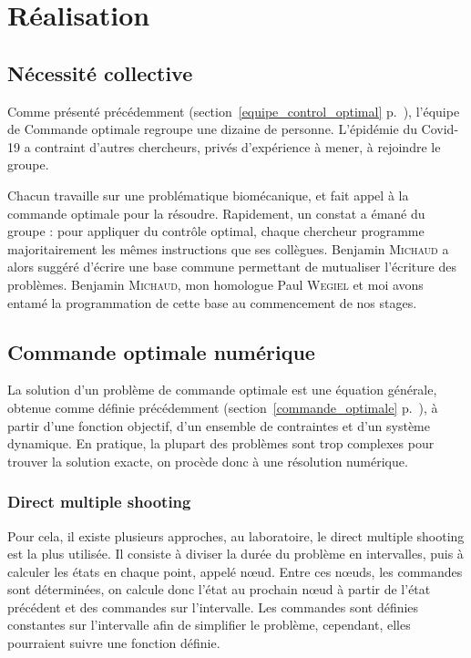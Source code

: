         
    \chapter{Réalisation}

        \section{Nécessité collective}
        
Comme présenté précédemment (section~\ref{equipe_control_optimal} p.~\pageref{equipe_control_optimal}), l'équipe de Commande optimale regroupe une dizaine de personne. L'épidémie du Covid-19 a contraint d'autres chercheurs, privés d'expérience à mener, à rejoindre le groupe.

Chacun travaille sur une problématique biomécanique, et fait appel à la commande optimale pour la résoudre. Rapidement,  un constat a émané du groupe : pour appliquer du contrôle optimal, chaque chercheur programme majoritairement les mêmes instructions que ses collègues.
Benjamin \textsc{Michaud} a alors suggéré d'écrire une base commune permettant de mutualiser l'écriture des problèmes. Benjamin \textsc{Michaud}, mon homologue Paul \textsc{Wegiel} et moi avons entamé la programmation de cette base au commencement de nos stages.
        
        
        \section{Commande optimale numérique}
        
        
    
La solution d’un problème de commande optimale est une équation générale, obtenue comme définie précédemment (section~\ref{commande_optimale} p.~\pageref{commande_optimale}), à partir d'une fonction objectif, d'un ensemble de contraintes et d'un système dynamique. En pratique, la plupart des problèmes sont trop complexes pour trouver la solution exacte, on procède donc à une résolution numérique.

            \subsection{Direct multiple shooting}

Pour cela, il existe plusieurs approches, au laboratoire, le direct multiple shooting est la plus utilisée. Il consiste à diviser la durée du problème en intervalles, puis à calculer les états en chaque point, appelé nœud. Entre ces nœuds, les commandes sont déterminées, on calcule donc l’état au prochain nœud à partir de l’état précédent et des commandes sur l’intervalle.
Les commandes sont définies constantes sur l’intervalle afin de simplifier le problème, cependant, elles pourraient suivre une fonction définie.

